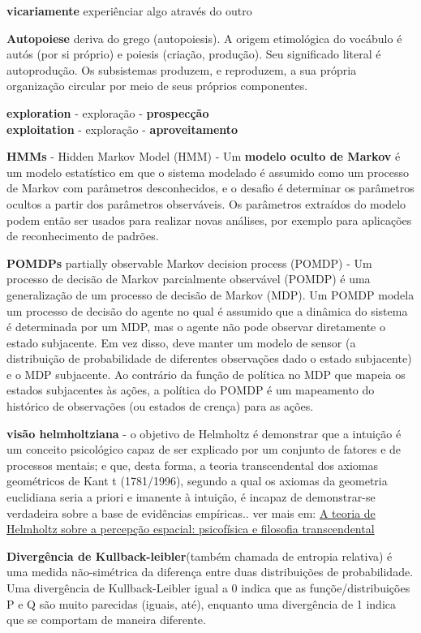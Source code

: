 \documentclass[
  12pt,
]{book}
\begin{document}
\textbf{vicariamente} experiênciar algo através do outro

\textbf{Autopoiese} deriva do grego (autopoiesis). A origem etimológica do vocábulo é autós (por si próprio) e poiesis (criação, produção). Seu significado literal é autoprodução. Os subsistemas produzem, e reproduzem, a sua própria organização circular por meio de seus próprios componentes.

\textbf{exploration} - exploração - \textbf{prospecção}\\
\textbf{exploitation} - exploração - \textbf{aproveitamento}

\textbf{HMMs} - Hidden Markov Model (HMM) - Um \textbf{modelo oculto de Markov} é um modelo estatístico em que o sistema modelado é assumido como um processo de Markov com parâmetros desconhecidos, e o desafio é determinar os parâmetros ocultos a partir dos parâmetros observáveis. Os parâmetros extraídos do modelo podem então ser usados para realizar novas análises, por exemplo para aplicações de reconhecimento de padrões.

\textbf{POMDPs} partially observable Markov decision process (POMDP) - Um processo de decisão de Markov parcialmente observável (POMDP) é uma generalização de um processo de decisão de Markov (MDP). Um POMDP modela um processo de decisão do agente no qual é assumido que a dinâmica do sistema é determinada por um MDP, mas o agente não pode observar diretamente o estado subjacente. Em vez disso, deve manter um modelo de sensor (a distribuição de probabilidade de diferentes observações dado o estado subjacente) e o MDP subjacente. Ao contrário da função de política no MDP que mapeia os estados subjacentes às ações, a política do POMDP é um mapeamento do histórico de observações (ou estados de crença) para as ações.

\textbf{visão helmholtziana} - o objetivo de Helmholtz é demonstrar que a intuição é um conceito psicológico capaz de ser explicado por um conjunto de fatores e de processos mentais; e que, desta forma, a teoria transcendental dos axiomas geométricos de Kant t (1781/1996), segundo a qual os axiomas da geometria euclidiana seria a
priori e imanente à intuição, é incapaz de demonstrar-se verdadeira sobre a base de
evidências empíricas..
ver mais em: \href{https://periodicos.ufmg.br/index.php/memorandum/article/download/6857/4411/22713}{A teoria de Helmholtz sobre a percepção espacial: psicofísica e
filosofia transcendental}

\textbf{Divergência de Kullback-leibler}(também chamada de entropia relativa) é uma medida não-simétrica da diferença entre duas distribuições de probabilidade. Uma divergência de Kullback-Leibler igual a 0 indica que as funçõe/distribuições P e Q são muito parecidas (iguais, até), enquanto uma divergência de 1 indica que se comportam de maneira diferente.
\end{document}
